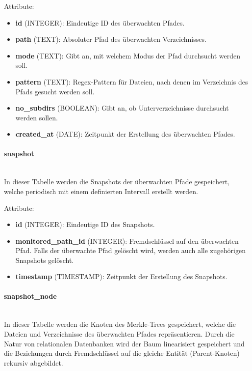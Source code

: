 \documentclass[a4paper,12pt]{report}
\begin{document}
    Attribute:
    \begin{itemize}
        \item \textbf{id} (INTEGER): Eindeutige ID des überwachten Pfades.
        \item \textbf{path} (TEXT): Absoluter Pfad des überwachten Verzeichnisses.
        \item \textbf{mode} (TEXT): Gibt an, mit welchem Modus der Pfad durchsucht werden soll.
        \item \textbf{pattern} (TEXT): Regex-Pattern für Dateien, nach denen im Verzeichnis des Pfads gesucht werden soll.
        \item \textbf{no\_subdirs} (BOOLEAN): Gibt an, ob Unterverzeichnisse durchsucht werden sollen.
        \item \textbf{created\_at} (DATE): Zeitpunkt der Erstellung des überwachten Pfades.
    \end{itemize}

    \paragraph*{snapshot}\mbox{}\\
    In dieser Tabelle werden die Snapshots der überwachten Pfade gespeichert,
    welche periodisch mit einem definierten Intervall erstellt werden.

    Attribute:
    \begin{itemize}
        \item \textbf{id} (INTEGER): Eindeutige ID des Snapshots.
        \item \textbf{monitored\_path\_id} (INTEGER): Fremdschlüssel auf den überwachten Pfad.
        Falls der überwachte Pfad gelöscht wird, werden auch alle zugehörigen Snapshots gelöscht.
        \item \textbf{timestamp} (TIMESTAMP): Zeitpunkt der Erstellung des Snapshots.
    \end{itemize}

    \paragraph*{snapshot\_node}\mbox{}\\
    In dieser Tabelle werden die Knoten des Merkle-Trees gespeichert, welche die Dateien und Verzeichnisse des überwachten Pfades repräsentieren.
    Durch die Natur von relationalen Datenbanken wird der Baum linearisiert gespeichert und die Beziehungen durch Fremdschlüssel auf die gleiche Entität (Parent-Knoten) rekursiv abgebildet.
\end{document}
